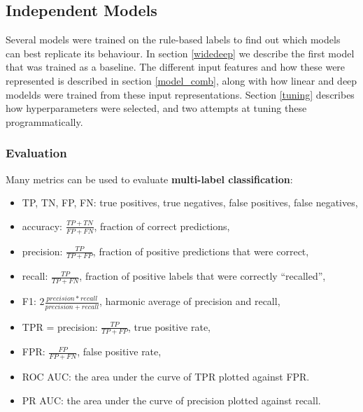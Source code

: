 \subsection{Independent Models}
\label{exp_models}

Several models were trained on the rule-based labels to find out which models can best replicate its behaviour.
In section \ref{widedeep} we describe the first model that was trained as a baseline.
The different input features and how these were represented is described in section \ref{model_comb}, along with how linear and deep modelds were trained from these input representations.
Section \ref{tuning} describes how hyperparameters were selected, and two attempts at tuning these programmatically.


\subsubsection{Evaluation}

Many metrics can be used to evaluate \textbf{multi-label classification}:

\begin{itemize}
  \item TP, TN, FP, FN: true positives, true negatives, false positives, false negatives,
  \item accuracy: $\frac{TP + TN}{FP + FN}$, fraction of correct predictions,
  \item precision: $\frac{TP}{TP + FP}$, fraction of positive predictions that were correct,
  \item recall: $\frac{TP}{TP + FN}$, fraction of positive labels that were correctly ``recalled'',
  \item F1: $2\frac{precision * recall}{precision + recall}$, harmonic average of precision and recall,
  \item TPR = precision: $\frac{TP}{TP+FP}$, true positive rate,
  \item FPR: $\frac{FP}{FP+FN}$, false positive rate,
  \item ROC AUC: the area under the curve of TPR plotted against FPR.
  \item PR AUC: the area under the curve of precision plotted against recall.
\end{itemize}

